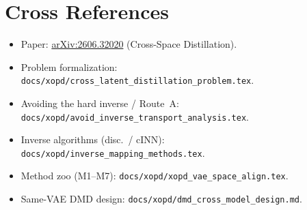 \documentclass[11pt,a4paper]{article}
\theoremstyle{definition}
\begin{document}
\section*{Cross References}
\begin{itemize}[leftmargin=1.4em,itemsep=1pt]
  \item Paper:
        \href{https://arxiv.org/abs/2606.32020}{arXiv:2606.32020}
        (Cross-Space Distillation).
  \item Problem formalization:
        \texttt{docs/xopd/cross\_latent\_distillation\_problem.tex}.
  \item Avoiding the hard inverse / Route~A:
        \texttt{docs/xopd/avoid\_inverse\_transport\_analysis.tex}.
  \item Inverse algorithms (disc.\ / cINN):
        \texttt{docs/xopd/inverse\_mapping\_methods.tex}.
  \item Method zoo (M1--M7):
        \texttt{docs/xopd/xopd\_vae\_space\_align.tex}.
  \item Same-VAE DMD design:
        \texttt{docs/xopd/dmd\_cross\_model\_design.md}.
\end{itemize}
\end{document}
